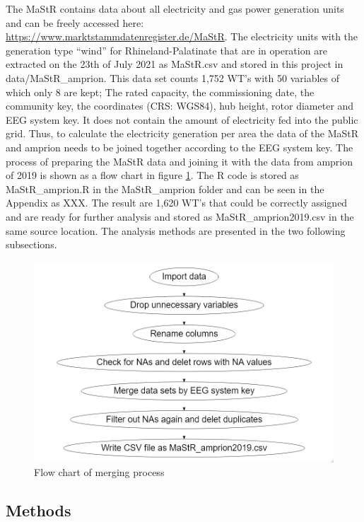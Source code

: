 \documentclass[a4paper,11pt]{article}
\begin{document}
The MaStR contains data about all electricity and gas power generation units and can be freely accessed here: \href{https://www.marktstammdatenregister.de/MaStR/Einheit/Einheiten/OeffentlicheEinheitenuebersicht}{https://www.marktstammdatenregister.de/MaStR}. The electricity units with the generation type ``wind'' for Rhineland-Palatinate that are in operation are extracted on the 23th of July 2021 as MaStR.csv and stored in this project in data/MaStR\_amprion. This data set counts 1,752 WT's with 50 variables of which only 8 are kept; The rated capacity, the commissioning date, the community key, the coordinates (CRS: WGS84), hub height, rotor diameter and EEG system key. It does not contain the amount of electricity fed into the public grid. Thus, to calculate the electricity generation per area the data of the MaStR and amprion needs to be joined together according to the EEG system key. The process of preparing the MaStR data and joining it with the data from amprion of 2019 is shown as a flow chart in figure \ref{fig:merge}. The R code is stored as MaStR\_amprion.R in the MaStR\_amprion folder and can be seen in the Appendix as XXX. The result are 1,620 WT's that could be correctly assigned and are ready for further analysis and stored as MaStR\_amprion2019.csv in the same source location. The analysis methods are presented in the two following subsections.
\begin{figure}

{\centering \includegraphics[width=0.8\linewidth]{data/MaStR_amprion_join/mergeflow} 

}

\caption{Flow chart of merging process}\label{fig:merge}
\end{figure}
\hypertarget{methods}{%
\subsection{Methods}\label{methods}}
\end{document}
